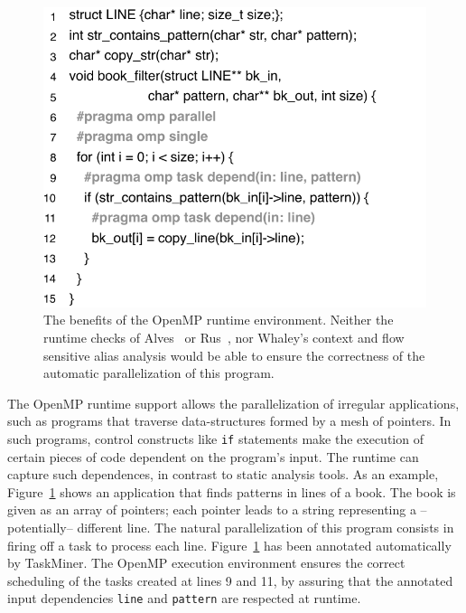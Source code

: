 \documentclass[sigplan,10pt,review,anonymous]{acmart}
\newcommand\Taskminer{\mbox{\textsf{TaskMiner}}}
\begin{document}
\begin{figure}[t!]
\begin{center}
\includegraphics[width=1\columnwidth]{images/ex_book_filter}
\caption{The benefits of the OpenMP runtime environment.
Neither the runtime checks of Alves~\cite{Alves15} or Rus~\cite{Rus02}, nor
Whaley's context and flow sensitive alias analysis would be able to ensure the
correctness of the automatic parallelization of this program.}
\label{fig:ex_book_filter}
\end{center}
\end{figure}

The OpenMP runtime support allows the parallelization of irregular applications,
such as programs that traverse data-structures formed by a mesh of pointers.
In such programs, control constructs like {\tt if} statements make the
execution  of certain pieces of code dependent on the program's input.
The runtime can capture such dependences, in contrast to static analysis tools.
As an example, Figure~\ref{fig:ex_book_filter} shows an application that
finds patterns in lines of a book.
The book is given as an array of pointers; each pointer leads to a
string representing a --potentially-- different line.
The natural parallelization of this program consists in firing off a task
to process each line.
Figure~\ref{fig:ex_book_filter} has been annotated automatically by
\Taskminer.
The OpenMP execution environment ensures the correct scheduling of the tasks
created at lines 9 and 11, by assuring that the annotated input dependencies
{\tt line} and {\tt pattern}  are 
respected at runtime.
\end{document}
